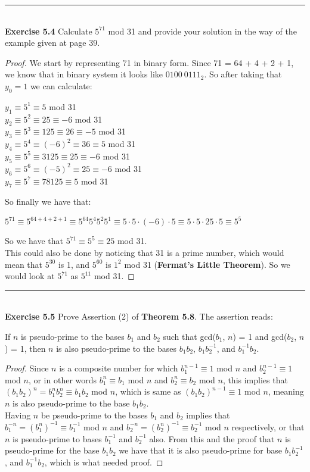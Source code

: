 \documentclass{article}
\begin{document}
\noindent\rule{12cm}{0.4pt}\\
\noindent \textbf{Exercise 5.4} Calculate $5^{71}$ mod 31 and provide your solution in the way of the example given at page 39.
\begin{proof}
We start by representing 71 in binary form. Since 71 = 64 + 4 + 2 + 1, we know that in binary system it looks like $0100\ 0111_{2}$. So after taking that $y_0 = 1$ we can calculate:
\begin{center}
$y_1 \equiv 5^1 \equiv 5$ mod 31\\
$y_2 \equiv 5^2 \equiv 25 \equiv -6$ mod 31\\
$y_3 \equiv 5^3 \equiv 125 \equiv 26 \equiv -5$ mod 31\\
$y_4 \equiv 5^4 \equiv (-6)^2 \equiv 36 \equiv 5$ mod 31\\
$y_5 \equiv 5^5 \equiv 3125 \equiv 25 \equiv -6$ mod 31\\
$y_6 \equiv 5^6 \equiv (-5)^2 \equiv 25 \equiv -6$ mod 31\\
$y_7 \equiv 5^7 \equiv 78125 \equiv 5$ mod 31\\
\end{center}
So finally we have that:
\begin{center}
$5^{71} \equiv 5^{64+4+2+1} \equiv 5^{64}5^{4}5^{2}5^{1} \equiv 5 \cdot 5 \cdot (-6) \cdot 5 \equiv 5 \cdot 5 \cdot 25 \cdot 5 \equiv 5^5$
\end{center}
So we have that $5^71 \equiv 5^5 \equiv 25$ mod 31.\\
This could also be done by noticing that 31 is a prime number, which would mean that $5^{30}$ is 1, and $5^{60}$ is $1^2$ mod 31 (\textbf{Fermat's Little Theorem}). So we would look at $5^{71}$ as $5^{11}$ mod 31.
\end{proof}



\noindent\rule{12cm}{0.4pt}\\
\noindent \textbf{Exercise 5.5} Prove Assertion (2) of \textbf{Theorem 5.8}. The assertion reads:
\begin{center}
If $n$ is pseudo-prime to the bases $b_1$ and $b_2$ such that gcd($b_1$, $n$) = 1 and gcd($b_2$, $n$) = 1, then $n$ is also pseudo-prime to the bases $b_{1}b_{2}$, $b_{1}b_{2}^{-1}$, and $b_{1}^{-1}b_{2}$.
\end{center}
\begin{proof}
Since $n$ is a composite number for which $b_{1}^{n-1} \equiv 1$ mod $n$ and $b_{2}^{n-1} \equiv 1$ mod $n$, or in other words $b_{1}^n \equiv b_{1}$ mod $n$ and $b_{2}^n \equiv b_{2}$ mod $n$, this implies that $(b_{1}b_{2})^n = b_{1}^{n}b_{2}^{n} \equiv b_{1}b_{2}$ mod $n$, which is same as $(b_{1}b_{2})^{n-1} \equiv 1$ mod $n$, meaning $n$ is also pseudo-prime to the base $b_{1}b_{2}$.\\
Having $n$ be pseudo-prime to the bases $b_1$ and $b_2$ implies that $b_1^{-n} = {(b_1^{n})}^{-1} \equiv b_1^{-1}$ mod $n$ and $b_2^{-n} = {(b_2^{n})}^{-1} \equiv b_2^{-1}$ mod $n$ respectively, or that $n$ is pseudo-prime to bases $b_{1}^{-1}$ and $b_{2}^{-1}$ also. From this and the proof that $n$ is pseudo-prime for the base $b_{1}b_{2}$ we have that it is also pseudo-prime for base $b_{1}b_{2}^{-1}$, and $b_{1}^{-1}b_{2}$, which is what needed proof.
\end{proof}
\end{document}
